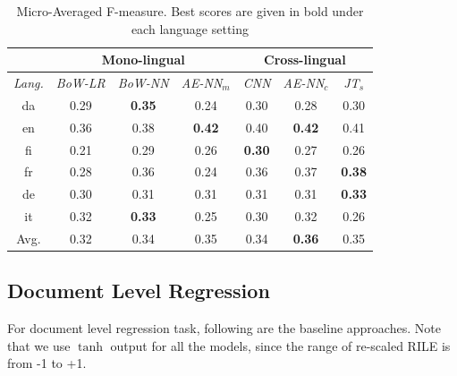 \documentclass[11pt,a4paper]{article}
\begin{document}
 \begin{table}[!htp]
  \centering
  \begin{tabular}{ c@{\hskip 0.2in} c c c@{\hskip 0.25in} c c c}
  \toprule
   &  \multicolumn{3}{c}{Mono-lingual} & \multicolumn{3}{c}{Cross-lingual} \\
  \toprule
    \em{Lang.} & \em{BoW-LR} & \em{BoW-NN} & \em{AE-NN}$_{m}$ & \em{CNN} & \em{AE-NN}$_{c}$ & \em{JT}$_{s}$\\
    \midrule
    da  & 	0.29 & \textbf{0.35} & 0.24 & 0.30 & 0.28 & 0.30\\
    en   &  0.36 & 0.38 & \textbf{0.42} & 0.40 & \textbf{0.42} & 0.41\\    	
    fi  &   0.21 & 0.29 & 0.26 & \textbf{0.30} & 0.27 & 0.26\\
    fr    & 0.28 & 0.36 & 0.24 & 0.36 & 0.37 & \textbf{0.38} \\
    de    &  0.30 & 0.31 & 0.31 & 0.31 & 0.31 & \textbf{0.33}\\
    it    & 0.32 & \textbf{0.33} & 0.25 & 0.30 & 0.32 & 0.26\\
\midrule
Avg.    & 0.32 & 0.34 & 0.35 & 0.34 & \textbf{0.36} & 0.35\\

 \bottomrule

  \end{tabular}
  \caption{Micro-Averaged F-measure. Best scores are given in bold under each language setting}
  \label{tab:al}
\end{table}

\subsection{Document Level Regression}
For document level regression task, following are the baseline approaches. Note that we use $\tanh$ output for all the models, since the range of re-scaled RILE is from -1 to +1.
\end{document}
